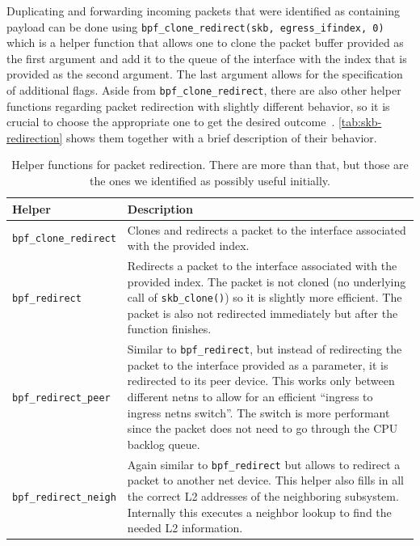 Duplicating and forwarding incoming packets that were identified as containing payload can be done 
using \verb|bpf_clone_redirect(skb, egress_ifindex, 0)| which is a helper function
that allows one to clone the packet buffer provided as the first argument and add it to the 
queue of the interface with the index that is provided as the second argument.
The last argument allows for the specification of additional flags.
Aside from \verb|bpf_clone_redirect|, there are also other helper functions regarding packet
redirection with slightly different behavior, so it is crucial to choose the appropriate one
to get the desired outcome~\parencite{bpf-helpers-man-page,eBPF-redirects-types}.
\autoref{tab:skb-redirection} shows them together with a brief description of their behavior.

\begin{table}[H]
    \centering
    \begin{tabular}{L{7cm}L{7cm}}
        \toprule
            Helper & Description \\
        \midrule
            \verb|bpf_clone_redirect| & Clones and redirects a packet to the interface associated with the provided index.\\
        \midrule
            \verb|bpf_redirect| & Redirects a packet to the interface associated with the provided index. The packet is not cloned 
                                    (no underlying call of \verb|skb_clone()|) so it is slightly more efficient.
                                    The packet is also not redirected immediately but after the function finishes.\\ 
        \midrule
            \verb|bpf_redirect_peer| & Similar to \verb|bpf_redirect|, but instead of redirecting the packet to the interface provided 
                                        as a parameter, it is redirected to its peer device. This works only between different netns to 
                                        allow for an efficient ``ingress to ingress netns switch''. The switch is more performant since 
                                        the packet does not need to go through the CPU backlog queue.\\ %
        \midrule
            \verb|bpf_redirect_neigh| & Again similar to \verb|bpf_redirect| but allows to redirect a packet to another net device. 
                                        This helper also fills in all the correct L2 addresses of the neighboring subsystem. 
                                        Internally this executes a neighbor lookup to find the needed L2 information. \\
        \bottomrule
    \end{tabular}
    \caption[Redirection helpers for packet buffer]{Helper functions for packet redirection.
    There are more than that, but those are the ones we identified as possibly useful 
    initially.}\label{tab:skb-redirection}
\end{table}

